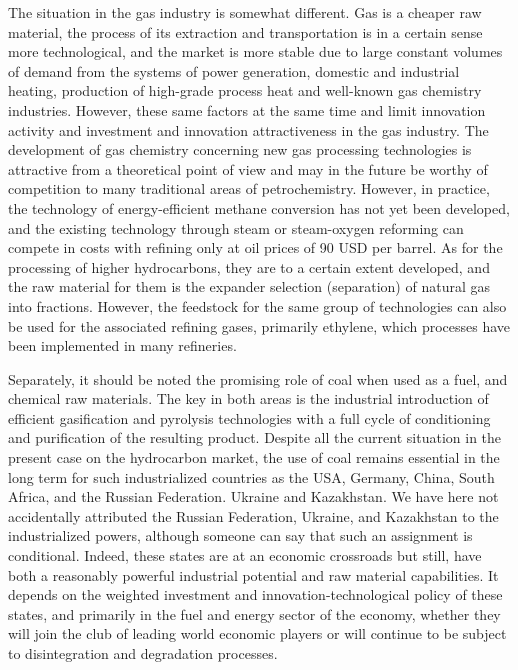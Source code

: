 \documentclass[12pt]{report}
\theoremstyle{definition}
\begin{document}
The situation in the gas industry is somewhat different.
Gas is a cheaper raw material, the process of its extraction and transportation is in a certain sense more technological, and the market is more stable due to large constant volumes of demand from the systems of power generation, domestic and industrial heating, production of high-grade process heat and well-known gas chemistry industries.
However, these same factors at the same time and limit innovation activity and investment and innovation attractiveness in the gas industry.
The development of gas chemistry concerning new gas processing technologies is attractive from a theoretical point of view and may in the future be worthy of competition to many traditional areas of petrochemistry.
However, in practice, the technology of energy-efficient methane conversion has not yet been developed, and the existing technology through steam or steam-oxygen reforming can compete in costs with refining only at oil prices of 90 USD per barrel.
As for the processing of higher hydrocarbons, they are to a certain extent developed, and the raw material for them is the expander selection (separation) of natural gas into fractions.
However, the feedstock for the same group of technologies can also be used for the associated refining gases, primarily ethylene, which processes have been implemented in many refineries.

Separately, it should be noted the promising role of coal when used as a fuel, and chemical raw materials.
The key in both areas is the industrial introduction of efficient gasification and pyrolysis technologies with a full cycle of conditioning and purification of the resulting product.
Despite all the current situation in the present case on the hydrocarbon market, the use of coal remains essential in the long term for such industrialized countries as the USA, Germany, China, South Africa, and the Russian Federation.
Ukraine and Kazakhstan.
We have here not accidentally attributed the Russian Federation, Ukraine, and Kazakhstan to the industrialized powers, although someone can say that such an assignment is conditional.
Indeed, these states are at an economic crossroads but still, have both a reasonably powerful industrial potential and raw material capabilities.
It depends on the weighted investment and innovation-technological policy of these states, and primarily in the fuel and energy sector of the economy, whether they will join the club of leading world economic players or will continue to be subject to disintegration and degradation processes.
\end{document}
